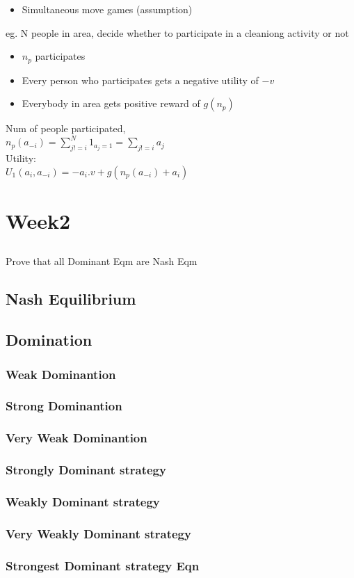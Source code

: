 \documentclass{article}
\begin{document}
\begin{itemize}[itemsep=0pt,parsep=0pt,topsep=0pt]
  \item Simultaneous move games (assumption)
\end{itemize}

eg. N people in area, decide whether to participate in a cleaniong activity or not\\


\begin{itemize}[itemsep=0pt,parsep=0pt,topsep=0pt]
  \item $n_p$ participates
  \item Every person who participates gets a negative utility of $-v$
  \item Everybody in area gets positive reward of $g(n_p)$
\end{itemize}
 
Num of people participated, \\
$n_p(a_{-i}) = \sum_{j != i}^{N} 1_{a_j = 1} = \sum_{j!=i} a_j$ \\

Utility:\\
$U_1(a_i, a_{-i}) = -a_i . v + g(n_p(a_{-i}) + a_i)$

\section{Week2}

\subsection{}

Prove that all Dominant Eqm are Nash Eqm

\subsection{Nash Equilibrium}

\subsection{Domination}
\subsubsection{Weak Dominantion}
\subsubsection{Strong Dominantion}
\subsubsection{Very Weak Dominantion}
\subsubsection{Strongly Dominant strategy}
\subsubsection{Weakly Dominant strategy}
\subsubsection{Very Weakly Dominant strategy}
\subsubsection{Strongest Dominant strategy Eqn}
\end{document}

